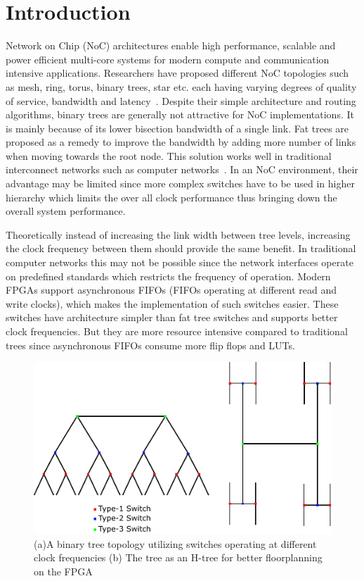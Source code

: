 \section{Introduction}
Network on Chip (NoC) architectures enable high performance, scalable and power efficient multi-core systems for modern compute and communication intensive applications.
Researchers have proposed different NoC topologies such as mesh, ring, torus, binary trees, star etc. each having varying degrees of quality of service, bandwidth and latency~\cite{Dally2003}.
Despite their simple architecture and routing algorithms, binary trees are generally not attractive for NoC implementations.
It is mainly because of its lower bisection bandwidth of a single link.
Fat trees are proposed as a remedy to improve the bandwidth by adding more number of links when moving towards the root node.
This solution works well in traditional interconnect networks such as computer networks~\cite{Shainer2011}.
In an NoC environment, their advantage may be limited since more complex switches have to be used in higher hierarchy which limits the over all clock performance thus bringing down the overall system performance. 

Theoretically instead of increasing the link width between tree levels, increasing the clock frequency between them should provide the same benefit.
In traditional computer networks this may not be possible since the network interfaces operate on predefined standards which restricts the frequency of operation.
Modern FPGAs support asynchronous FIFOs (FIFOs operating at different read and write clocks), which makes the implementation of such switches easier.
These switches have architecture simpler than fat tree switches and supports better clock frequencies.
But they are more resource intensive compared to traditional trees since asynchronous FIFOs consume more flip flops and LUTs.


\begin{figure}[t]
\centering
   \includegraphics[width=0.9\columnwidth]{Figures/HNoC.pdf}
   \caption{(a)A binary tree topology utilizing switches operating at different clock frequencies (b) The tree as an H-tree for better floorplanning on the FPGA}
   \label{fig:btree}
   \vspace{-5 mm}
\end{figure}


